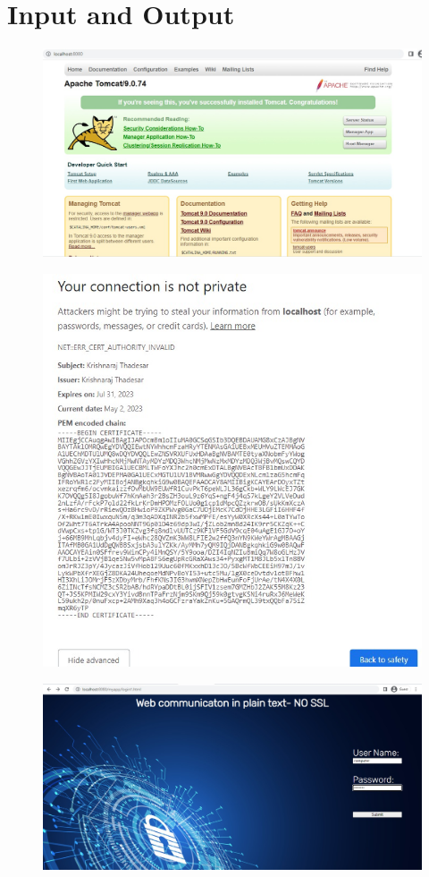 \documentclass[openany]{book}
\begin{document}
\section{Input and Output}
\begin{figure}[H]
    \centering
    \includegraphics[width=.95\textwidth]{tomcat.jpeg}
    \caption{}
\end{figure}
\begin{figure}[H]
    \centering
    \includegraphics[width=.95\textwidth]{tomcat1.jpeg}
    \caption{}
\end{figure}
\begin{figure}[H]
    \centering
    \includegraphics[width=.95\textwidth]{tomcat2.jpeg}
    \caption{}
\end{figure}
\end{document}

